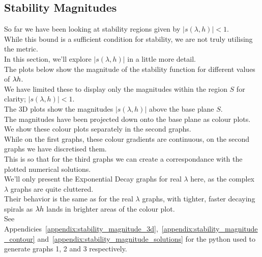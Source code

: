 \subsection{Stability Magnitudes}
So far we have been looking at stability regions given by $|s(\lambda, h)| < 1$.\\
While this bound is a sufficient condition for stability, we are not truly utilising the metric.\\
In this section, we'll explore $|s(\lambda, h)|$ in a little more detail.\\
The plots below show the magnitude of the stability function for different values of $\lambda h$.\\
We have limited these to display only the magnitudes within the region $S$ for clarity; $|s(\lambda, h)| < 1$.\\
The 3D plots show the magnitudes $|s(\lambda, h)|$ above the base plane $S$.\\
The magnitudes have been projected down onto the base plane as colour plots.\\
We show these colour plots separately in the second graphs.\\
While on the first graphs, these colour gradients are continuous, on the second graphs we have discretised them.\\
This is so that for the third graphs we can create a correspondance with the plotted numerical solutions.\\
We'll only present the Exponential Decay graphs for real $\lambda$ here, as the complex $\lambda$ graphs are quite cluttered.\\
Their behavior is the same as for the real $\lambda$ graphs, with tighter, faster decaying spirals as $\lambda h$ lands in brighter areas of the colour plot.\\
See Appendicies~\ref{appendix:stability_magnitude_3d},~\ref{appendix:stability_magnitude_contour} and~\ref{appendix:stability_magnitude_solutions} for the python used to generate graphs 1, 2 and 3 respectively.\\
